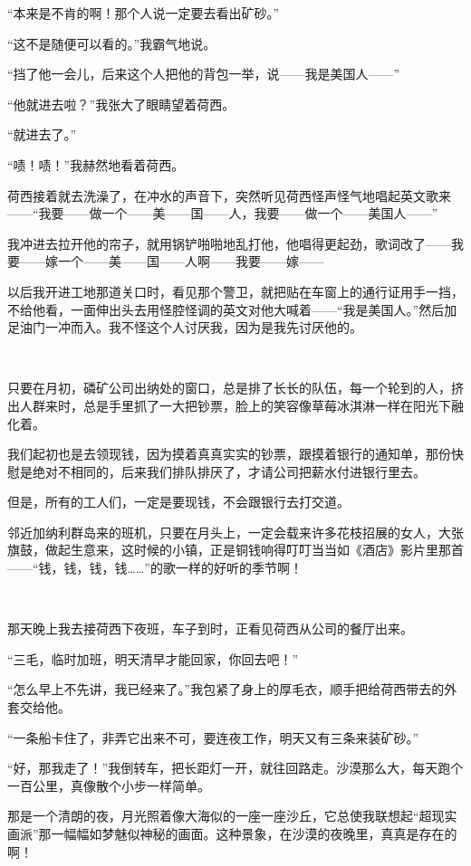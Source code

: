 \par “本来是不肯的啊！那个人说一定要去看出矿砂。”
\par “这不是随便可以看的。”我霸气地说。
\par “挡了他一会儿，后来这个人把他的背包一举，说——我是美国人——”
\par “他就进去啦？”我张大了眼睛望着荷西。
\par “就进去了。”
\par “啧！啧！”我赫然地看着荷西。
\par 荷西接着就去洗澡了，在冲水的声音下，突然听见荷西怪声怪气地唱起英文歌来——“我要——做一个——美——国——人，我要——做一个——美国人——”
\par 我冲进去拉开他的帘子，就用锅铲啪啪地乱打他，他唱得更起劲，歌词改了——我要——嫁一个——美——国——人啊——我要——嫁——
\par 以后我开进工地那道关口时，看见那个警卫，就把贴在车窗上的通行证用手一挡，不给他看，一面伸出头去用怪腔怪调的英文对他大喊着——“我是美国人。”然后加足油门一冲而入。我不怪这个人讨厌我，因为是我先讨厌他的。
\par  
\par 只要在月初，磷矿公司出纳处的窗口，总是排了长长的队伍，每一个轮到的人，挤出人群来时，总是手里抓了一大把钞票，脸上的笑容像草莓冰淇淋一样在阳光下融化着。
\par 我们起初也是去领现钱，因为摸着真真实实的钞票，跟摸着银行的通知单，那份快慰是绝对不相同的，后来我们排队排厌了，才请公司把薪水付进银行里去。
\par 但是，所有的工人们，一定是要现钱，不会跟银行去打交道。
\par 邻近加纳利群岛来的班机，只要在月头上，一定会载来许多花枝招展的女人，大张旗鼓，做起生意来，这时候的小镇，正是铜钱响得叮叮当当如《酒店》影片里那首——“钱，钱，钱，钱……”的歌一样的好听的季节啊！
\par  
\par 那天晚上我去接荷西下夜班，车子到时，正看见荷西从公司的餐厅出来。
\par “三毛，临时加班，明天清早才能回家，你回去吧！”
\par “怎么早上不先讲，我已经来了。”我包紧了身上的厚毛衣，顺手把给荷西带去的外套交给他。
\par “一条船卡住了，非弄它出来不可，要连夜工作，明天又有三条来装矿砂。”
\par “好，那我走了！”我倒转车，把长距灯一开，就往回路走。沙漠那么大，每天跑个一百公里，真像散个小步一样简单。
\par 那是一个清朗的夜，月光照着像大海似的一座一座沙丘，它总使我联想起“超现实画派”那一幅幅如梦魅似神秘的画面。这种景象，在沙漠的夜晚里，真真是存在的啊！
